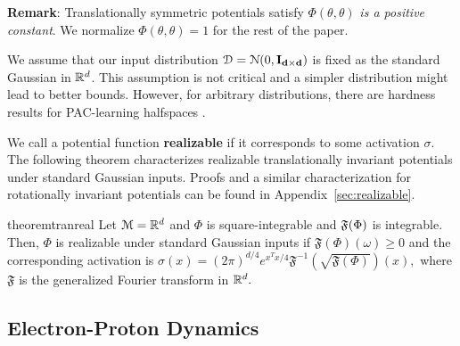 {\bf Remark}: Translationally symmetric potentials satisfy
$\Phi(\theta,\theta)$ {\it is a positive constant}. We normalize
$\Phi(\theta,\theta) = 1$ for the rest of the paper.
  
We assume that our input distribution
$\mathcal{D} = \mathcal{N}(0, {\bf I_{d\times d}})$ is fixed as the
standard Gaussian in ${\mathbb{R}}^d$. This assumption is not critical and a
simpler distribution might lead to better bounds. However, for
arbitrary distributions, there are hardness results for PAC-learning
halfspaces \cite{klivans2006cryptographic}.

We call a potential function {\bf realizable} if it corresponds to
some activation $\sigma$.  The following theorem characterizes
realizable translationally invariant potentials under standard
Gaussian inputs. Proofs and a similar characterization for rotationally invariant
potentials can be found in Appendix~\ref{sec:realizable}.
%
\begin{restatable}{theorem}{tranreal}
\label{thm:tranReal}
Let $\mathcal{M} = {\mathbb{R}}^d$ and $\Phi$ is square-integrable and
${\mathfrak{F}}(\Phi)$ is integrable. Then, $\Phi$ is realizable under standard
Gaussian inputs if $\mathfrak{F}(\Phi)(\omega) \geq 0$ and the
corresponding activation is
$\sigma(x) =
(2\pi)^{d/4}e^{x^Tx/4}\mathfrak{F}^{-1}(\sqrt{\mathfrak{F}(\Phi)})(x),
$ where $\mathfrak{F}$ is the generalized Fourier transform in ${\mathbb{R}}^d.$
\end{restatable}
%

%
\subsection{Electron-Proton Dynamics}

%
%

